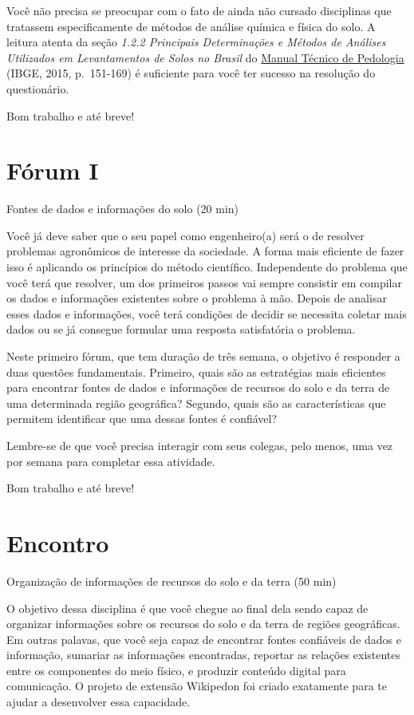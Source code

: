 \documentclass[
  11pt,
  a4paper,
  dvipsnames]{tufte-book}
\begin{document}
Você não precisa se preocupar com o fato de ainda não cursado disciplinas que tratassem especificamente de métodos de análise química e física do solo. A leitura atenta da seção \emph{1.2.2 Principais Determinações e Métodos de Análises Utilizados em Levantamentos de Solos no Brasil} do \href{https://biblioteca.ibge.gov.br/visualizacao/livros/liv95017.pdf}{Manual Técnico de Pedologia} (IBGE, 2015, p.~151-169) é suficiente para você ter sucesso na resolução do questionário.

Bom trabalho e até breve!

\hypertarget{fuxf3rum-i}{%
\section{Fórum I}\label{fuxf3rum-i}}

Fontes de dados e informações do solo (20 min)

Você já deve saber que o seu papel como engenheiro(a) será o de resolver problemas agronômicos de interesse da sociedade. A forma mais eficiente de fazer isso é aplicando os princípios do método científico. Independente do problema que você terá que resolver, um dos primeiros passos vai sempre consistir em compilar os dados e informações existentes sobre o problema à mão. Depois de analisar esses dados e informações, você terá condições de decidir se necessita coletar mais dados ou se já consegue formular uma resposta satisfatória o problema.

Neste primeiro fórum, que tem duração de três semana, o objetivo é responder a duas questões fundamentais. Primeiro, quais são as estratégias mais eficientes para encontrar fontes de dados e informações de recursos do solo e da terra de uma determinada região geográfica? Segundo, quais são as características que permitem identificar que uma dessas fontes é confiável?

Lembre-se de que você precisa interagir com seus colegas, pelo menos, uma vez por semana para completar essa atividade.

Bom trabalho e até breve!

\hypertarget{encontro-1}{%
\section{Encontro}\label{encontro-1}}

Organização de informações de recursos do solo e da terra (50 min)

O objetivo dessa disciplina é que você chegue ao final dela sendo capaz de organizar informações sobre os recursos do solo e da terra de regiões geográficas. Em outras palavas, que você seja capaz de encontrar fontes confiáveis de dados e informação, sumariar as informações encontradas, reportar as relações existentes entre os componentes do meio físico, e produzir conteúdo digital para comunicação. O projeto de extensão Wikipedon foi criado exatamente para te ajudar a desenvolver essa capacidade.
\end{document}
